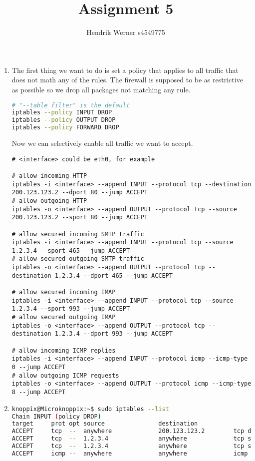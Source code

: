 \documentclass[12pt, a4paper]{article}
\title{Assignment 5}
\author{Hendrik Werner s4549775}
\begin{document}
\maketitle

\section{} %
\begin{enumerate}[a]
	\item %
	The first thing we want to do is set a policy that applies to all traffic that does not math any of the rules. The firewall is supposed to be as restrictive as possible so we drop all packages not matching any rule.

	\begin{lstlisting}[language=bash]
# "--table filter" is the default
iptables --policy INPUT DROP
iptables --policy OUTPUT DROP
iptables --policy FORWARD DROP
	\end{lstlisting}

	Now we can selectively enable all traffic we want to accept.

	\begin{lstlisting}
# <interface> could be eth0, for example

# allow incoming HTTP
iptables -i <interface> --append INPUT --protocol tcp --destination 200.123.123.2 --dport 80 --jump ACCEPT
# allow outgoing HTTP
iptables -o <interface> --append OUTPUT --protocol tcp --source 200.123.123.2 --sport 80 --jump ACCEPT

# allow secured incoming SMTP traffic
iptables -i <interface> --append INPUT --protocol tcp --source 1.2.3.4 --sport 465 --jump ACCEPT
# allow secured outgoing SMTP traffic
iptables -o <interface> --append OUTPUT --protocol tcp --destination 1.2.3.4 --dport 465 --jump ACCEPT

# allow secured incoming IMAP
iptables -i <interface> --append INPUT --protocol tcp --source 1.2.3.4 --sport 993 --jump ACCEPT
# allow secured outgoing IMAP
iptables -o <interface> --append OUTPUT --protocol tcp --destination 1.2.3.4 --dport 993 --jump ACCEPT

# allow incoming ICMP replies
iptables -i <interface> --append INPUT --protocol icmp --icmp-type 0 --jump ACCEPT
# allow outgoing ICMP requests
iptables -o <interface> --append OUTPUT --protocol icmp --icmp-type 8 --jump ACCEPT
	\end{lstlisting}
	\item %
	\begin{lstlisting}[language=bash]
knoppix@Microknoppix:~$ sudo iptables --list
Chain INPUT (policy DROP)
target     prot opt source               destination
ACCEPT     tcp  --  anywhere             200.123.123.2        tcp dpt:http
ACCEPT     tcp  --  1.2.3.4              anywhere             tcp spt:ssmtp
ACCEPT     tcp  --  1.2.3.4              anywhere             tcp spt:imaps
ACCEPT     icmp --  anywhere             anywhere             icmp echo-reply


\end{lstlisting}
\end{enumerate}
\end{document}
